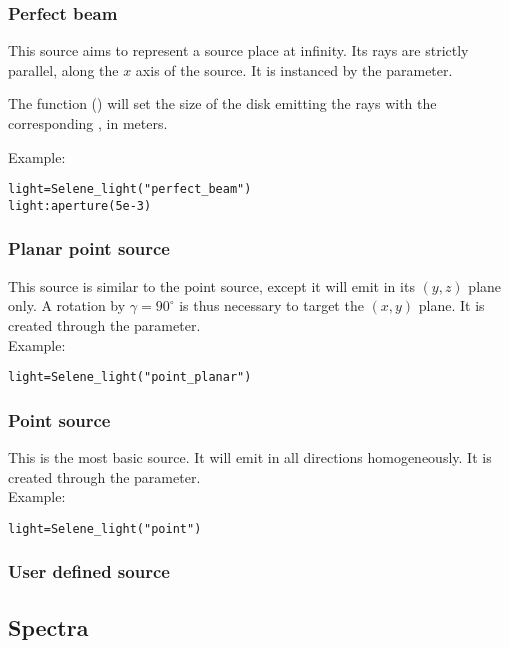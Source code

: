 \subsubsection{Perfect beam}

This source aims to represent a source place at infinity. Its rays are strictly parallel, along the $x$ axis of the source. It is instanced by the  parameter.

The function () will set the size of the disk emitting the rays with the corresponding , in meters.

\noindent Example:
\begin{lstlisting}
light=Selene_light("perfect_beam")
light:aperture(5e-3)
\end{lstlisting}

\subsubsection{Planar point source}

This source is similar to the point source, except it will emit in its $(y,z)$ plane only. A rotation by $\gamma=90^\circ$ is thus necessary to target the $(x,y)$ plane. It is created through the  parameter.\\ Example:
\begin{lstlisting}
light=Selene_light("point_planar")
\end{lstlisting}

\subsubsection{Point source}

This is the most basic source. It will emit in all directions homogeneously. It is created through the  parameter.\\ Example:
\begin{lstlisting}
light=Selene_light("point")
\end{lstlisting}

\subsubsection{User defined source}

\subsection{Spectra}

